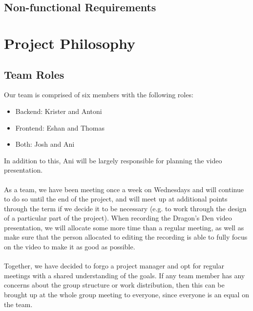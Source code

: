 \documentclass{article}
\begin{document}
\subsection{Non-functional Requirements}

\section{Project Philosophy}
\subsection{Team Roles}
Our team is comprised of six members with the following roles:
\begin{itemize}
    \item Backend: Krister and Antoni
    \item Frontend: Eshan and Thomas
    \item Both: Josh and Ani
\end{itemize}
In addition to this, Ani will be largely responsible for planning the video presentation.\\\\
As a team, we have been meeting once a week on Wednesdays and will continue to do 
so until the end of the project, and will meet up at additional points through the term if we decide it to be necessary 
(e.g. to work through the design of a particular part of the project). When recording the Dragon's 
Den video presentation, we will allocate some more time than a regular meeting, as well as make sure that 
the person allocated to editing the recording is able to fully focus on the video to make it as good as possible.\\\\
Together, we have decided to forgo a project manager and opt for regular meetings 
with a shared understanding of the goals. If any team member has any concerns about the group 
structure or work distribution, then this can be brought up at the whole group meeting 
to everyone, since everyone is an equal on the team.
\end{document}
